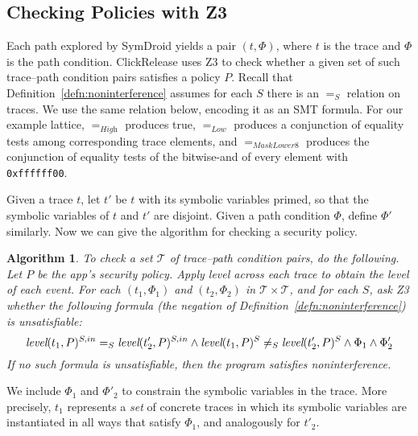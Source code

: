 \documentclass{llncs}
\newcommand{\code}[1]{\textsf{#1}} \newcommand{\bcode}[1]{\texttt{#1}}
\newtheorem{algorithm}{Algorithm}
\newcommand{\toolname}{ClickRelease\xspace}
\newcommand{\tr}{t\xspace}
\newcommand{\tset}{\ensuremath{\mathcal{T}}\xspace}
\newcommand{\tleveltr}[2]{\textit{level}(#1, #2)}
\begin{document}
\subsection{Checking Policies with Z3}

Each path explored by SymDroid yields a pair $(t, \Phi)$, where $t$ is
the trace and $\Phi$ is the path condition. \toolname{} uses Z3 to check whether a given set
of such trace--path condition pairs satisfies a policy $P$. Recall that
Definition~\ref{defn:noninterference} assumes for each $S$ there is an
$=_S$ relation on traces. We use the same relation below, encoding it
as an SMT formula. For our example lattice, $=_\textit{High}$ produces
\code{true}, $=_\textit{Low}$ produces a conjunction of equality tests
among corresponding trace elements, and $=_\textit{MaskLower8}$
produces the conjunction of equality tests of the bitwise-and of every
element with \bcode{0xffffff00}.

Given a trace
$t$, let $t'$ be $t$ with its symbolic variables primed, so that the
symbolic variables of $t$ and $t'$ are disjoint. Given a path
condition $\Phi$, define $\Phi'$ similarly. Now we can give the
algorithm for checking a security policy.

\begin{algorithm}
  To check a set $\tset$ of trace--path condition pairs, do the
  following. Let $P$ be the app's security policy. Apply \emph{level}
  across each trace to obtain the level of each event.  For each
  $(t_1, \Phi_1)$ and $(t_2, \Phi_2)$ in $\tset\times\tset$, and for
  each $S$, ask Z3 whether the following formula (the negation of
  Definition~\ref{defn:noninterference}) is unsatisfiable:
  \begin{displaymath}
      \tleveltr{\tr_1}{P}^{S,in} =_S \tleveltr{\tr_2'}{P}^{S,in} \land
      \tleveltr{\tr_1}{P}^S \neq_S \tleveltr{\tr_2'}{P}^S \land
      \Phi_1 \land \Phi_2' \\
  \end{displaymath}
  If no such formula is unsatisfiable, then the program satisfies noninterference.
\end{algorithm}
We include $\Phi_1$ and $\Phi'_2$ to
constrain the symbolic variables in the trace. More precisely,
$\tr_1$ represents a \emph{set} of concrete traces in which its symbolic
variables are instantiated in all ways that satisfy $\Phi_1$,
and analogously for $\tr'_2$.
\end{document}
